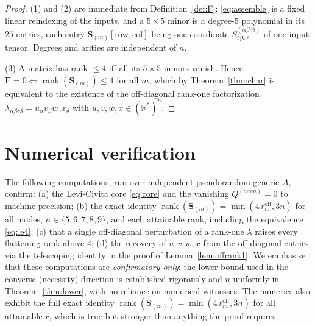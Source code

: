 \begin{proof}
(1) and (2) are immediate from Definition~\ref{def:F}: \eqref{eq:assemble} is a fixed
linear reindexing of the inputs, and a $5\times5$ minor is a degree-$5$ polynomial in
its $25$ entries, each entry $\mathbf S_{(m)}[\text{row},\text{col}]$ being one
coordinate $S^{(\alpha\beta\gamma\delta)}_{ijk\ell}$ of one input tensor. Degrees and
arities are independent of $n$.

(3) A matrix has rank $\le4$ iff all its $5\times5$ minors vanish. Hence $\mathbf F=0
\iff\operatorname{rank}(\mathbf S_{(m)})\le4$ for all $m$, which by
Theorem~\ref{thm:char} is equivalent to the existence of the off-diagonal rank-one
factorization $\lambda_{\alpha\beta\gamma\delta}=u_\alpha v_\beta w_\gamma x_\delta$ with
$u,v,w,x\in(\mathbb R^*)^n$.
\end{proof}

\appendix
\section{Numerical verification}

The following computations, run over independent pseudorandom generic $A$, confirm:
(a) the Levi-Civita core \eqref{eq:core} and the vanishing $Q^{(aaaa)}=0$ to machine
precision;
(b) the exact identity $\operatorname{rank}(\mathbf S_{(m)})=\min(4\,r_m^{\mathrm{off}},3n)$
for all modes, $n\in\{5,6,7,8,9\}$, and each attainable rank, including the equivalence
\eqref{eq:le4};
(c) that a single off-diagonal perturbation of a rank-one $\lambda$ raises every
flattening rank above $4$;
(d) the recovery of $u,v,w,x$ from the off-diagonal entries via the telescoping
identity in the proof of Lemma~\ref{lem:offrank1}.
We emphasise that these computations are \emph{confirmatory only}: the lower bound used in
the converse (necessity) direction is established rigorously and $n$-uniformly in
Theorem~\ref{thm:lower}, with no reliance on numerical witnesses. The numerics also exhibit
the full exact identity $\operatorname{rank}(\mathbf S_{(m)})=\min(4\,r_m^{\mathrm{off}},3n)$
for all attainable $r$, which is true but stronger than anything the proof requires.


